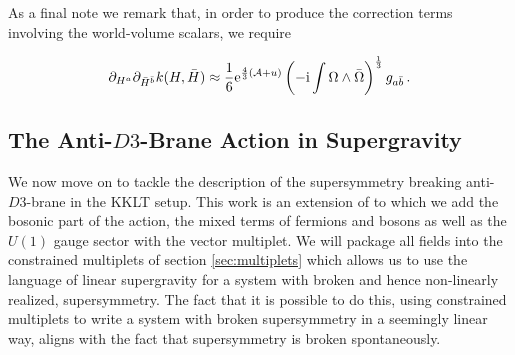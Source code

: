 \documentclass[12pt]{report}
\newcommand{\be}{\begin{equation}}
\newcommand{\ee}{\end{equation}}
\def\rmi{{\rm i}}
\def\rme{{\rm e}}
\begin{document}
As a final note we remark that, in order to produce the correction terms involving the world-volume scalars, we require

\be
\partial_{H^a}\partial_{\bar{H}^{\bar{b}}} k(H,\bar{H}) \approx \frac{1}{6} \rme^{\frac{4}{3} (\mathcal{A} + u )} \left(-\rmi \int \Omega \wedge \bar{\Omega} \right)^{\frac{1}{3}} g_{a\bar{b}}\,.
\ee

\subsection{The Anti-$D3$-Brane Action in Supergravity}
\label{sec:sugraact}
We now move on to tackle the description of the supersymmetry breaking anti-$D3$-brane in the KKLT setup. This work is an extension of \cite{GarciadelMoral:2017vnz} to which we add the bosonic part of the action, the mixed terms of fermions and bosons as well as the $U(1)$ gauge sector with the vector multiplet. We will package all fields into the constrained multiplets of section \ref{sec:multiplets} which allows us to use the language of linear supergravity for a system with broken and hence non-linearly realized, supersymmetry. The fact that it is possible to do this, using constrained multiplets to write a system with broken supersymmetry in a seemingly linear way, aligns with the fact that supersymmetry is broken spontaneously.
\end{document}
